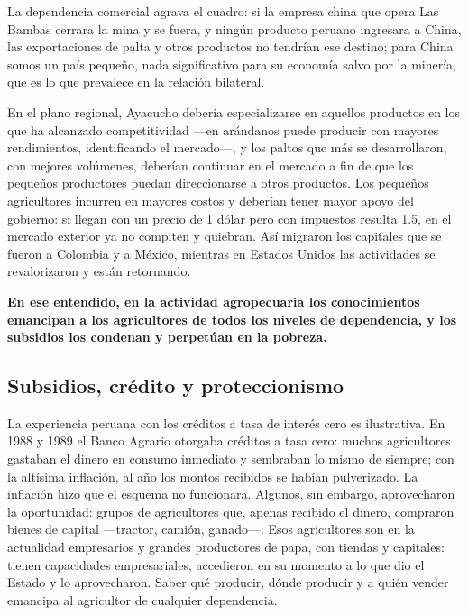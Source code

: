 \documentclass[
  man,
  floatsintext,
  longtable,
  a4paper,
  nolmodern,
  notxfonts,
  notimes,
  12pt,
  colorlinks=true,linkcolor=blue,citecolor=blue,urlcolor=blue]{apa7}
\begin{document}
La dependencia comercial agrava el cuadro: si la empresa china que opera
Las Bambas cerrara la mina y se fuera, y ningún producto peruano
ingresara a China, las exportaciones de palta y otros productos no
tendrían ese destino; para China somos un país pequeño, nada
significativo para su economía salvo por la minería, que es lo que
prevalece en la relación bilateral.

En el plano regional, Ayacucho debería especializarse en aquellos
productos en los que ha alcanzado competitividad ---en arándanos puede
producir con mayores rendimientos, identificando el mercado---, y los
paltos que más se desarrollaron, con mejores volúmenes, deberían
continuar en el mercado a fin de que los pequeños productores puedan
direccionarse a otros productos. Los pequeños agricultores incurren en
mayores costos y deberían tener mayor apoyo del gobierno: si llegan con
un precio de 1 dólar pero con impuestos resulta 1.5, en el mercado
exterior ya no compiten y quiebran. Así migraron los capitales que se
fueron a Colombia y a México, mientras en Estados Unidos las actividades
se revalorizaron y están retornando.

\textbf{En ese entendido, en la actividad agropecuaria los conocimientos
emancipan a los agricultores de todos los niveles de dependencia, y los
subsidios los condenan y perpetúan en la pobreza.}

\subsection{Subsidios, crédito y
proteccionismo}\label{subsidios-cruxe9dito-y-proteccionismo}

La experiencia peruana con los créditos a tasa de interés cero es
ilustrativa. En 1988 y 1989 el Banco Agrario otorgaba créditos a tasa
cero: muchos agricultores gastaban el dinero en consumo inmediato y
sembraban lo mismo de siempre; con la altísima inflación, al año los
montos recibidos se habían pulverizado. La inflación hizo que el esquema
no funcionara. Algunos, sin embargo, aprovecharon la oportunidad: grupos
de agricultores que, apenas recibido el dinero, compraron bienes de
capital ---tractor, camión, ganado---. Esos agricultores son en la
actualidad empresarios y grandes productores de papa, con tiendas y
capitales: tienen capacidades empresariales, accedieron en su momento a
lo que dio el Estado y lo aprovecharon. Saber qué producir, dónde
producir y a quién vender emancipa al agricultor de cualquier
dependencia.
\end{document}
